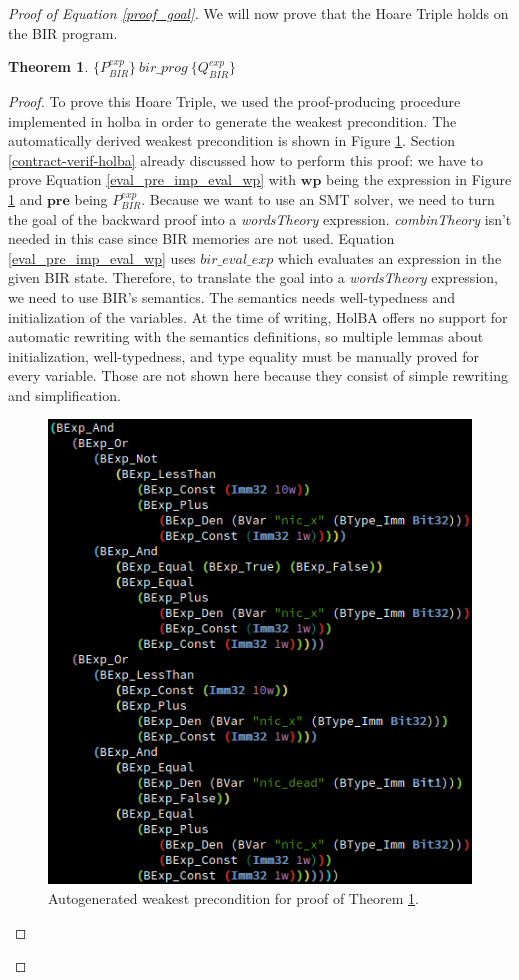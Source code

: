 \documentclass{kththesis}
\newcommand{\htriple}[3]{\ensuremath{\{#1\}~#2~\{#3\}}}
\newtheorem{theorem}{Theorem}[section]
\begin{document}
{\begin{proof}[Proof of Equation \ref{proof_goal}]
We will now prove that the Hoare Triple holds on the BIR program.
\bigskip

\begin{theorem} \label{proof_ht_thm}
\htriple{P^{exp}_{BIR}}{bir\_prog}{Q^{exp}_{BIR}}
\end{theorem}

\begin{proof}
To prove this Hoare Triple, we used the \gls{proof-producing} procedure implemented in \gls{holba} in order to generate the weakest precondition. The automatically derived weakest precondition is shown in Figure \ref{proof_wp_exp}. Section \ref{contract-verif-holba} already discussed how to perform this proof: we have to prove Equation \ref{eval_pre_imp_eval_wp} with $\mathbf{wp}$ being the expression in Figure \ref{proof_wp_exp} and $\mathbf{pre}$ being $P^{exp}_{BIR}$. Because we want to use an \gls{SMT} solver, we need to turn the goal of the backward proof into a \textit{wordsTheory} expression. \textit{combinTheory} isn't needed in this case since BIR memories are not used. Equation \ref{eval_pre_imp_eval_wp} uses $bir\_eval\_exp$ which evaluates an expression in the given BIR state. Therefore, to translate the goal into a \textit{wordsTheory} expression, we need to use BIR's semantics. The semantics needs well-typedness and initialization of the variables. At the time of writing, HolBA offers no support for automatic rewriting with the semantics definitions, so multiple lemmas about initialization, well-typedness, and type equality must be manually proved for every variable. Those are not shown here because they consist of simple rewriting and simplification.

\begin{figure}[!h]
	\includegraphics[scale=.65]{figures/proof_wp_exp.png}
	\centering
	\caption{Autogenerated weakest precondition for proof of Theorem \ref{proof_ht_thm}.}
	\label{proof_wp_exp}
\end{figure}


\end{proof}
\end{proof}}
\end{document}
